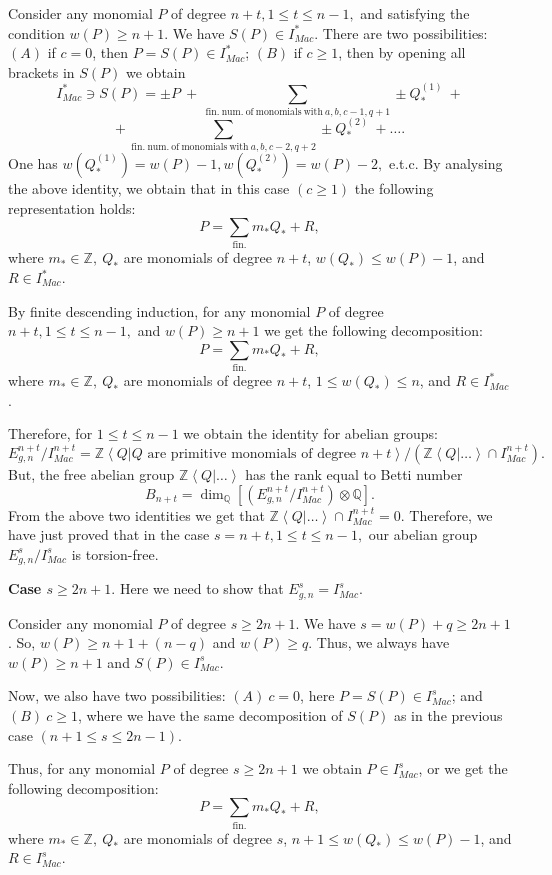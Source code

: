 \documentclass[a4paper,14pt]{article}
\newcommand{\Q}{\mathbb{Q}}
\newcommand{\Z}{\mathbb{Z}}
\begin{document}
Consider any monomial $P$ of degree $n+t, 1\le t\le n-1,$ and satisfying the condition $w(P)\ge n+1$. We have $S(P)\in I^*_{Mac}$. There are two possibilities: $(A)$ if $c=0$, then $P=S(P)\in I^*_{Mac}$; $(B)$ if $c\ge 1$, then by opening all brackets in $S(P)$ we obtain
$$
I^*_{Mac}\ni S(P) = \pm P \ + \  \sum_{ \mathrm{fin. \  num. \  of \ monomials \  with \ } a,b,c-1,q+1} \pm Q^{(1)}_{*} \ +
$$
$$
+ \ \sum_{ \mathrm{fin. \  num. \  of \ monomials \  with \ } a,b,c-2,q+2} \pm Q^{(2)}_{*} \ + \ldots.
$$
One has $w(Q^{(1)}_*)=w(P)-1, w(Q^{(2)}_*)=w(P)-2,$ e.t.c. By analysing the above identity, we obtain that in this case $(c\ge 1)$ the following representation holds:
$$
P = \sum_{\mathrm{fin.}} m_*Q_*  + R,
$$  
where $m_*\in \Z, \  Q_*$ are monomials of degree $n+t$, $w(Q_*)\le w(P) -1$, and $R\in I^*_{Mac}$.

By finite descending induction, for any monomial $P$ of degree $n+t, 1\le t\le n-1,$ and $w(P)\ge n+1$  we get the following decomposition:
$$
P = \sum_{\mathrm{fin.}} m_*Q_*  + R,
$$
where $m_*\in \Z, \  Q_*$ are monomials of degree $n+t$, $1\le w(Q_*)\le n$, and $R\in I^*_{Mac}$.

Therefore, for $1\le t\le n-1$ we obtain the identity for abelian groups:
$$
E^{n+t}_{g,n}/ I^{n+t}_{Mac} = \Z\left< Q | Q \mbox{ are primitive monomials of degree } n+t\right>/ (\Z\left< Q | \ldots \right>\cap I^{n+t}_{Mac}). 
$$
But, the free abelian group $\Z\left< Q | \ldots \right>$ has the rank equal to Betti number 
$$
B_{n+t} = \dim_{\Q}[(E^{n+t}_{g,n}/ I^{n+t}_{Mac})\otimes \Q].
$$
From the above two identities we get that $\Z\left< Q | \ldots \right>\cap I^{n+t}_{Mac} = 0$. Therefore, we have just proved that in the case $s=n+t,1\le t\le n-1,$ our abelian group $E^{s}_{g,n}/ I^{s}_{Mac}$ is torsion-free. 


{\bf Case $s\ge 2n+1$}. Here we need to show that $E^s_{g,n}=I^s_{Mac}$.

Consider any monomial $P$ of degree $s\ge 2n+1$. We have $s=w(P) + q\ge 2n+1$. So, $w(P)\ge n+1 + (n-q)$ and $w(P)\ge q$. Thus, we always have $w(P)\ge n+1$ and $S(P)\in I^s_{Mac}$. 

Now, we also have two possibilities: $(A) \  c=0$, here $P=S(P)\in I^s_{Mac}$; and $(B) \ c\ge 1$, where we have the same decomposition of $S(P)$ as in the previous case $(n+1\le s\le 2n-1)$. 

Thus, for any monomial $P$ of degree $s\ge 2n+1$ we obtain $P\in I^s_{Mac}$, or we get the following decomposition:
$$
P = \sum_{\mathrm{fin.}} m_*Q_*  + R,
$$
where $m_*\in \Z, \  Q_*$ are monomials of degree $s$, $n+1\le w(Q_*)\le w(P) - 1$, and $R\in I^s_{Mac}$. 
\end{document}

